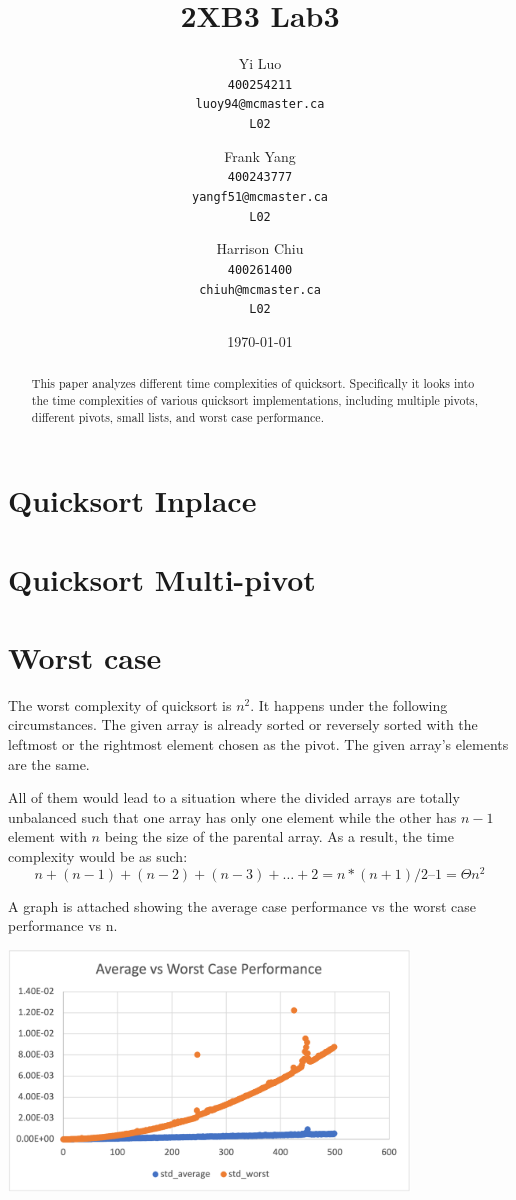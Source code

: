 \documentclass{article}
\title{2XB3 Lab3}
\author{
  Yi Luo\\
  \texttt{400254211}\\
  \texttt{luoy94@mcmaster.ca}\\
  \texttt{L02}
  \and
  Frank Yang\\
  \texttt{400243777}\\
  \texttt{yangf51@mcmaster.ca}\\
  \texttt{L02}
  \and
  Harrison Chiu\\
  \texttt{400261400}\\
  \texttt{chiuh@mcmaster.ca}\\
  \texttt{L02}
}
\date{\today}
\begin{document}
\maketitle

\begin{abstract}
This paper analyzes different time complexities of quicksort. Specifically it looks into the time complexities of various quicksort implementations, including multiple pivots, different pivots, small lists, and worst case performance.
\end{abstract}

\section*{Quicksort Inplace}


\section*{Quicksort Multi-pivot}

\section*{Worst case}
The worst complexity of quicksort is $n^2$. It happens under the following 
circumstances. The given array is already sorted or reversely sorted with 
the leftmost or the rightmost element chosen as the pivot. The given array’s 
elements are the same.

All of them would lead to a situation where the divided arrays are totally 
unbalanced such that one array has only one element while the other has $n - 1$ 
element with $n$ being the size of the parental array. As a result, the time 
complexity would be as such:
\begin{equation*}
n + (n - 1) + (n - 2) + (n - 3) + … + 2 = n * (n + 1) / 2 – 1 = \Theta{n^2}
\end{equation*}

A graph is attached showing the average case performance vs the worst case performance vs n.

\includegraphics[width=0.8\textwidth]{average_vs_worst_case_performance}
\end{document}
